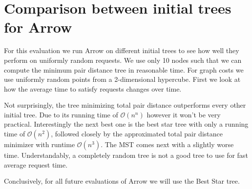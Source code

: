 \documentclass[a4paper, oneside]{discothesis}
\begin{document}


\section{Comparison between initial trees for Arrow}

For this evaluation we run Arrow on different initial trees to see how well they perform on uniformly random requests. We use only 10 nodes such that we can compute the minimum pair distance tree in reasonable time. For graph costs we use uniformly random points from a 2-dimensional hypercube. First we look at how the average time to satisfy requests changes over time.


Not surprisingly, the tree minimizing total pair distance outperforms every other initial tree. Due to its running time of $\mathcal{O}(n^n)$ however it won't be very practical. Interestingly the next best one is the best star tree with only a running time of $\mathcal{O}(n^2)$, followed closely by the approximated total pair distance minimizer with runtime $\mathcal{O}(n^3)$. The MST comes next with a slightly worse time. Understandably, a completely random tree is not a good tree to use for fast average request time.

Conclusively, for all future evaluations of Arrow we will use the Best Star tree.
\end{document}
